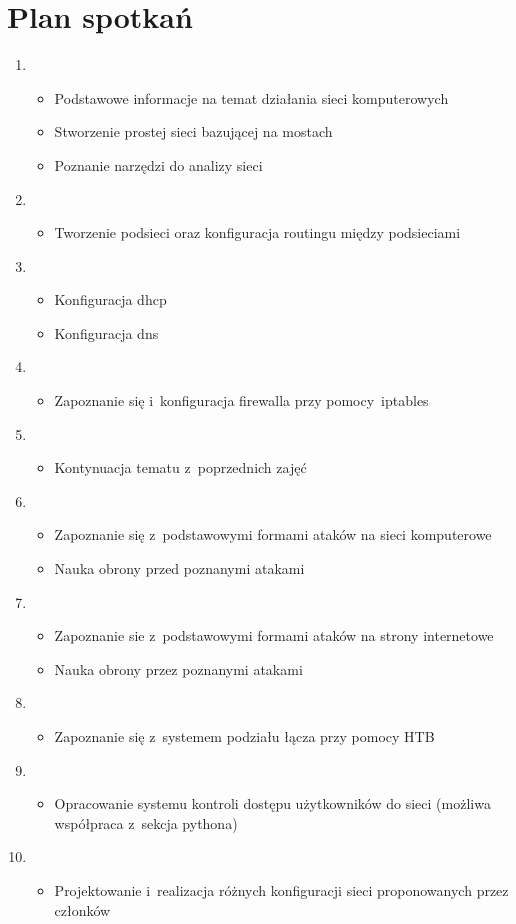 \documentclass[a4paper,12pt]{article}
\begin{document}
\section{Plan spotkań}
\begin{enumerate}
\item \begin{itemize}
	\item Podstawowe informacje na temat działania sieci komputerowych
	\item Stworzenie prostej sieci bazującej na mostach
	\item Poznanie narzędzi do analizy sieci
	\end{itemize}
\item \begin{itemize}
	\item Tworzenie podsieci oraz konfiguracja routingu między podsieciami
	\end{itemize}
\item \begin{itemize}
	\item Konfiguracja dhcp
	\item Konfiguracja dns
	\end{itemize}
\item \begin{itemize}
	\item Zapoznanie się i~konfiguracja firewalla przy pomocy~iptables
	\end{itemize}
\item \begin{itemize}
	\item Kontynuacja tematu z~poprzednich zajęć
	\end{itemize}
\item \begin{itemize}
	\item Zapoznanie się z~podstawowymi formami ataków na sieci komputerowe
	\item Nauka obrony przed poznanymi atakami
	\end{itemize}
\item \begin{itemize}
	\item Zapoznanie sie z~podstawowymi formami ataków na strony internetowe
	\item Nauka obrony przez poznanymi atakami
	\end{itemize}
\item \begin{itemize}
	\item Zapoznanie się z~systemem podziału łącza przy pomocy HTB
	\end{itemize}
\item \begin{itemize}
	\item Opracowanie systemu kontroli dostępu użytkowników do sieci (możliwa współpraca z~sekcja pythona)
	\end{itemize}
\item \begin{itemize}
	\item Projektowanie i~realizacja różnych konfiguracji sieci proponowanych przez członków
	\end{itemize}
\end{enumerate}
\end{document}
